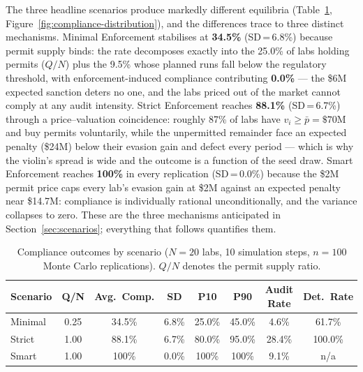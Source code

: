 The three headline scenarios produce markedly different equilibria (Table~\ref{tab:compliance-summary}, Figure~\ref{fig:compliance-distribution}), and the differences trace to three distinct mechanisms. Minimal Enforcement stabilises at \textbf{34.5\%} (SD\,=\,6.8\%) because permit supply binds: the rate decomposes exactly into the 25.0\% of labs holding permits ($Q/N$) plus the 9.5\% whose planned runs fall below the regulatory threshold, with enforcement-induced compliance contributing \textbf{0.0\%} --- the \$6M expected sanction deters no one, and the labs priced out of the market cannot comply at any audit intensity. Strict Enforcement reaches \textbf{88.1\%} (SD\,=\,6.7\%) through a price--valuation coincidence: roughly 87\% of labs have $v_i \geq \bar{p} = \$70$M and buy permits voluntarily, while the unpermitted remainder face an expected penalty (\$24M) below their evasion gain and defect every period --- which is why the violin's spread is wide and the outcome is a function of the seed draw. Smart Enforcement reaches \textbf{100\%} in every replication (SD\,=\,0.0\%) because the \$2M permit price caps every lab's evasion gain at \$2M against an expected penalty near \$14.7M: compliance is individually rational unconditionally, and the variance collapses to zero. These are the three mechanisms anticipated in Section~\ref{sec:scenarios}; everything that follows quantifies them.

\begin{table}[htbp]
\centering
\caption{Compliance outcomes by scenario ($N = 20$ labs, 10 simulation steps,
$n = 100$ Monte Carlo replications). $Q/N$ denotes the permit supply ratio.}
\label{tab:compliance-summary}
\small
\begin{tabular}{lccccccc}
\toprule
\textbf{Scenario} & \textbf{Q/N} & \textbf{Avg.\ Comp.} & \textbf{SD} &
  \textbf{P10} & \textbf{P90} & \textbf{Audit Rate} & \textbf{Det.\ Rate} \\
\midrule
Minimal & 0.25 & 34.5\% & 6.8\% & 25.0\% & 45.0\% & 4.6\%  & 61.7\% \\
Strict  & 1.00 & 88.1\% & 6.7\% & 80.0\% & 95.0\% & 28.4\% & 100.0\% \\
Smart & 1.00 & 100\%  & 0.0\% & 100\%  & 100\%  &  9.1\% & n/a \\
\bottomrule
\end{tabular}
\end{table}

